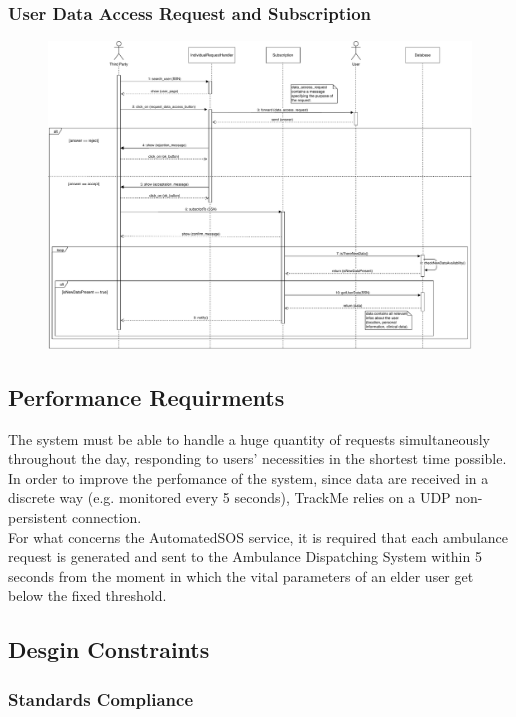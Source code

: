\documentclass[12pt,a4paper]{article}
\begin{document}
		\subsubsection{User Data Access Request and Subscription}
		\begin{figure}[H]
			\centering
			\includegraphics[width=1.25\linewidth]{Images/request_subscription_sequence}
			\label{fig:request_subscription_sequence}
		\end{figure}
		
	\subsection{Performance Requirments}
	The system must be able to handle a huge quantity of requests simultaneously throughout the day, responding to users' necessities in the shortest time possible. In order to improve the perfomance of the system, since data are received in a discrete way (e.g. monitored every 5 seconds), TrackMe relies on a UDP non-persistent connection.\\
	For what concerns the AutomatedSOS service, it is required that each ambulance request is generated and sent to the Ambulance Dispatching System within 5 seconds from the moment in which the vital parameters of an elder user get below the fixed threshold.
	
	\subsection{Desgin Constraints}
	\subsubsection{Standards Compliance}
\end{document}
